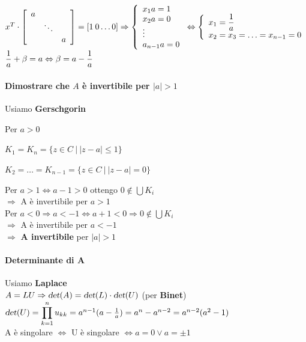 \documentclass[10pt]{book}
\begin{document}
\begin{math}
x^T\cdot\left[
\begin{array}{c c c}
	a & & \\
	& \ddots & \\
	& & a
\end{array}
\right] = [1\:0\ldots0] \Rightarrow \left\{ \begin{array}{l}
x_1a = 1\\x_2a = 0\\\vdots\\a_{n-1}a = 0
\end{array} \right. \Leftrightarrow \left\{ \begin{array}{l}
x_1 = \mathlarger{\frac{1}{a}}\\x_2 = x_3 = \ldots = x_{n-1} = 0
\end{array} \right.
\end{math}\\
\begin{math}
\mathlarger{\frac{1}{a}} + \beta = a \Leftrightarrow \mathlarger{\beta = a - \frac{1}{a}}
\end{math}
\paragraph{Dimostrare che $A$ è invertibile per $|a| > 1$} Usiamo \textbf{Gerschgorin}
\begin{list}{}{Per $a > 0$}
	\item $K_1 = K_n = \{z \in C\:|\: |z - a| \leq 1\}$
	\item $K_2 = \ldots = K_{n-1} = \{z \in C\:|\:|z - a| = 0\}$
\end{list}
Per $a > 1 \Leftrightarrow a - 1 > 0$ ottengo $0 \not\in \bigcup K_i$\\
$\Rightarrow$ A è invertibile per $a > 1$\\
Per $a < 0 \Rightarrow a < -1 \Leftrightarrow a + 1 < 0 \Rightarrow 0 \not\in\bigcup K_i$\\
$\Rightarrow$ A è invertibile per $a < -1$\\
$\Rightarrow$ \textbf{A invertibile} per $|a| > 1$
\paragraph{Determinante di A} Usiamo \textbf{Laplace}\\
$A = LU \Rightarrow \textsl{det}(A) = \textsl{det}(L)\cdot\textsl{det}(U)$ (per \textbf{Binet})\\
$\textsl{det}(U) = \mathlarger{\prod_{k=1}^n u_{kk}} = a^{n-1}(a - \frac{1}{a}) = a^n - a^{n-2} = a^{n-2}(a^2 - 1)$\\
A è singolare $\Leftrightarrow$ U è singolare $\Leftrightarrow a = 0 \vee a = \pm 1 $
\end{document}
